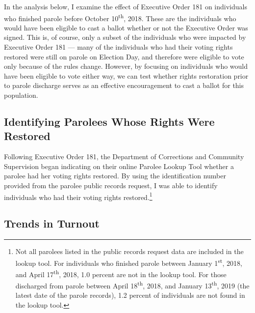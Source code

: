 \documentclass[]{article}
\let\rmarkdownfootnote\footnote%
\def\footnote{\protect\rmarkdownfootnote}
\begin{document}
In the analysis below, I examine the effect of Executive Order 181 on individuals who finished parole before October 10\textsuperscript{th}, 2018. These are the individuals who would have been eligible to cast a ballot whether or not the Executive Order was signed. This is, of course, only a subset of the individuals who were impacted by Executive Order 181 --- many of the individuals who had their voting rights restored were still on parole on Election Day, and therefore were eligible to vote only because of the rules change. However, by focusing on individuals who would have been eligible to vote either way, we can test whether rights restoration prior to parole discharge serves as an effective encouragement to cast a ballot for this population.

\hypertarget{identifying-parolees-whose-rights-were-restored}{%
\subsection*{Identifying Parolees Whose Rights Were Restored}\label{identifying-parolees-whose-rights-were-restored}}

Following Executive Order 181, the Department of Corrections and Community Supervision began indicating on their online Parolee Lookup Tool whether a parolee had her voting rights restored. By using the identification number provided from the parolee public records request, I was able to identify individuals who had their voting rights restored.\footnote{Not all parolees listed in the public records request data are included in the lookup tool. For individuals who finished parole between January 1\textsuperscript{st}, 2018, and April 17\textsuperscript{th}, 2018, 1.0 percent are not in the lookup tool. For those discharged from parole between April 18\textsuperscript{th}, 2018, and January 13\textsuperscript{th}, 2019 (the latest date of the parole records), 1.2 percent of individuals are not found in the lookup tool.}

\hypertarget{trends-in-turnout}{%
\subsection*{Trends in Turnout}\label{trends-in-turnout}}
\end{document}
